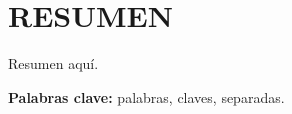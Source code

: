 \section*{\large{RESUMEN}}
\vspace{-0.35cm}
\justifying

Resumen aquí.

\vspace{-0.15cm}
\noindent \textbf{Palabras clave:} palabras, claves, separadas.